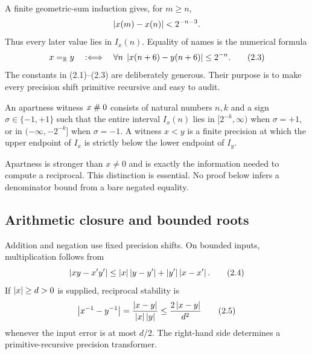 A finite geometric-sum induction gives, for \(m\ge n\),
\[
 \left|x(m)-x(n)\right|<2^{-n-3}.
\]
Thus every later value lies in \(I_x(n)\).  Equality of names is the numerical
formula
\begin{equation}
 x=_\mathbb R y\quad:\Longleftrightarrow\quad
 \forall n\;\left|x(n+6)-y(n+6)\right|\le2^{-n}.               \tag{2.3}
\end{equation}
The constants in (2.1)--(2.3) are deliberately generous.  Their purpose is to
make every precision shift primitive recursive and easy to audit.

\begin{definition}
An apartness witness \(x\mathrel{\#}0\) consists of natural numbers \(n,k\) and a
sign \(\sigma\in\{-1,+1\}\) such that the entire interval \(I_x(n)\) lies in
\([2^{-k},\infty)\) when \(\sigma=+1\), or in
\(({-}\infty,-2^{-k}]\) when \(\sigma=-1\).  A witness \(x<y\) is a finite
precision at which the upper endpoint of \(I_x\) is strictly below the lower
endpoint of \(I_y\).
\end{definition}

Apartness is stronger than \(x\ne0\) and is exactly the information needed to
compute a reciprocal.  This distinction is essential.  No proof below infers
a denominator bound from a bare negated equality.

\subsection{Arithmetic closure and bounded roots}

Addition and negation use fixed precision shifts.  On bounded inputs,
multiplication follows from
\begin{equation}
 \left|xy-x'y'\right|\le \left|x\right|\left|y-y'\right|+\left|y'\right|\left|x-x'\right|.
                                                               \tag{2.4}
\end{equation}
If \(\left|x\right|\ge d>0\) is supplied, reciprocal stability is
\begin{equation}
 \left|x^{-1}-y^{-1}\right|
 =\frac{\left|x-y\right|}{\left|x\right|\left|y\right|}
 \le \frac{2\left|x-y\right|}{d^2}                                 \tag{2.5}
\end{equation}
whenever the input error is at most \(d/2\).  The right-hand side determines a
primitive-recursive precision transformer.

